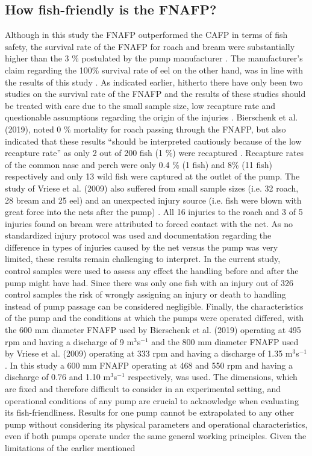 \documentclass[fleqn,10pt]{wlscirep}
\begin{document}
\subsection*{How fish-friendly is the FNAFP?}
Although in this study the FNAFP outperformed the CAFP in terms of fish safety, the survival rate of the FNAFP for roach and bream were substantially higher than the 3 \% postulated by the pump manufacturer \cite{Vriese2009OnderzoekBuisvijzel}. The manufacturer's claim regarding the 100\% survival rate of eel on the other hand, was in line with the results of  this study \cite{Vriese2009OnderzoekBuisvijzel}. As indicated earlier, hitherto there have only been two studies on the survival rate of the FNAFP and the results of these studies should be treated with care due to the small sample size, low recapture rate and questionable assumptions regarding the origin of the injuries \cite{Bierschenk2019FishPumps,Vriese2009OnderzoekBuisvijzel}. Bierschenk et al. (2019), noted 0 \% mortality for roach passing through the FNAFP, but also indicated that these results ``should be interpreted cautiously because of the low recapture rate'' as only 2 out of 200 fish (1 \%) were recaptured \cite{Bierschenk2019FishPumps}. Recapture rates of the common nase and perch were only 0.4 \% (1 fish) and 8\% (11 fish) respectively and only 13 wild fish were captured at the outlet of  the pump. The study of Vriese et al. (2009) also suffered from small sample sizes (i.e. 32 roach, 28 bream and 25 eel) and an unexpected injury source (i.e. fish were blown with great force into the nets after the pump) \cite{Vriese2009OnderzoekBuisvijzel}. All 16 injuries to the roach and 3 of 5 injuries found on bream were attributed to forced contact with the net. As no standardized injury protocol was used and documentation regarding the difference in types of injuries caused by the net versus the pump was very limited, these results remain challenging to interpret. In the current study, control samples were used to assess any effect the handling before and after the pump might have had. Since there was only one fish with an injury out of 326 control samples the risk of wrongly assigning an injury or death to handling instead of pump passage can be considered negligible. Finally, the characteristics of the pump and the conditions at which the pumps were operated differed, with the 600 mm diameter FNAFP used by Bierschenk et al. (2019) operating at 495 rpm and having a discharge of 9 m$^{3}$s$^{-1}$ and the 800 mm diameter FNAFP used by Vriese et al. (2009) operating at 333 rpm and having a discharge of 1.35 m$^{3}$s$^{-1}$ \cite{Bierschenk2019FishPumps,Vriese2009OnderzoekBuisvijzel}. In this study a 600 mm FNAFP operating at 468 and 550 rpm and having a discharge of 0.76 and 1.10 m$^{3}$s$^{-1}$ respectively, was used. The dimensions, which are fixed and therefore difficult to consider in an experimental setting, and operational conditions of any pump are crucial to acknowledge when evaluating its fish-friendliness. Results for one pump cannot be extrapolated to any other pump without considering its physical parameters and operational characteristics, even if both pumps operate under the same general working principles. Given the limitations of the earlier mentioned 
\end{document}
